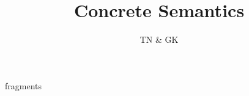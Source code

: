 \documentclass[11pt,a4paper]{article}
\begin{document}
\openisaverbatimout fragments

\title{Concrete Semantics}
\author{TN \& GK}
\maketitle

\tableofcontents
\newpage



\nocite{Nipkow}



\end{document}
